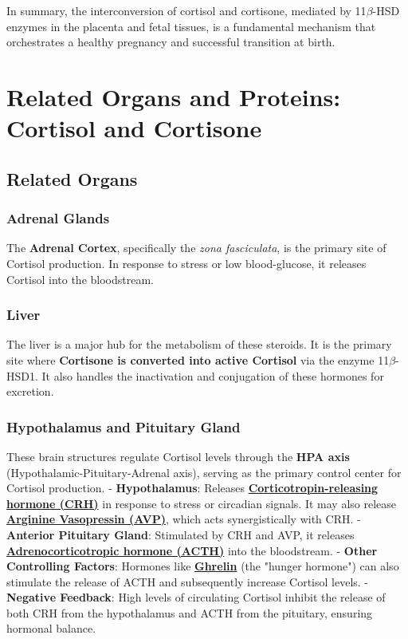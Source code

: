 \documentclass{article}
\begin{document}
In summary, the interconversion of cortisol and cortisone, mediated by 11\texorpdfstring{$\beta$}{beta}-HSD enzymes in the placenta and fetal tissues, is a fundamental mechanism that orchestrates a healthy pregnancy and successful transition at birth.


\section{Related Organs and Proteins: Cortisol and Cortisone}

\subsection{Related Organs}

\subsubsection{Adrenal Glands}
The \textbf{Adrenal Cortex}, specifically the \textit{zona fasciculata}, is the primary site of Cortisol production. In response to stress or low blood-glucose, it releases Cortisol into the bloodstream.

\subsubsection{Liver}
The liver is a major hub for the metabolism of these steroids. It is the primary site where \textbf{Cortisone is converted into active Cortisol} via the enzyme 11\texorpdfstring{$\beta$}{beta}-HSD1. It also handles the inactivation and conjugation of these hormones for excretion.

\subsubsection{Hypothalamus and Pituitary Gland}
These brain structures regulate Cortisol levels through the \textbf{HPA axis} (Hypothalamic-Pituitary-Adrenal axis), serving as the primary control center for Cortisol production.
- \textbf{Hypothalamus}: Releases \textbf{\href{https://www.proteinatlas.org/ENSG00000147571-CRH}{Corticotropin-releasing hormone (CRH)}} in response to stress or circadian signals. It may also release \textbf{\href{https://www.proteinatlas.org/ENSG00000101200-AVP}{Arginine Vasopressin (AVP)}}, which acts synergistically with CRH.
- \textbf{Anterior Pituitary Gland}: Stimulated by CRH and AVP, it releases \textbf{\href{https://www.proteinatlas.org/ENSG00000115138-POMC}{Adrenocorticotropic hormone (ACTH)}} into the bloodstream.
- \textbf{Other Controlling Factors}: Hormones like \textbf{\href{https://www.proteinatlas.org/ENSG00000157017-GHRL}{Ghrelin}} (the "hunger hormone") can also stimulate the release of ACTH and subsequently increase Cortisol levels.
- \textbf{Negative Feedback}: High levels of circulating Cortisol inhibit the release of both CRH from the hypothalamus and ACTH from the pituitary, ensuring hormonal balance.
\end{document}
